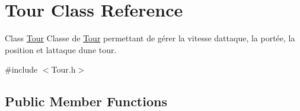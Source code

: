 \hypertarget{classTour}{}\section{Tour Class Reference}
\label{classTour}


Class \hyperlink{classTour}{Tour} Classe de \hyperlink{classTour}{Tour} permettant de gérer la vitesse d\textquotesingle{}attaque, la portée, la position et l\textquotesingle{}attaque d\textquotesingle{}une tour.  




{\ttfamily \#include $<$Tour.\+h$>$}

\subsection*{Public Member Functions}
